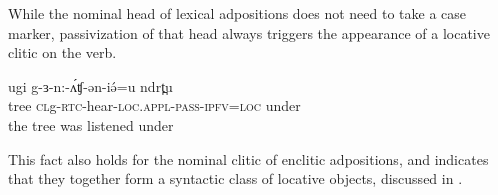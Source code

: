 While the nominal head of lexical adpositions does not need to take a case marker, passivization of that head always triggers the appearance of a locative clitic on the verb.

\ea \gll ugi g-ɜ-n:-ʌ́ʧ-ən-iə́=u ndrt̪u\\
tree \textsc{cl}g-\textsc{rtc}-hear-\textsc{loc.appl-pass-ipfv=loc} under\\ 
\glt	the tree was listened under	\\
\z

This fact also holds for the nominal clitic of enclitic adpositions, and indicates that they together form a syntactic class of locative objects, discussed in .

%
%
%
%
%


%


